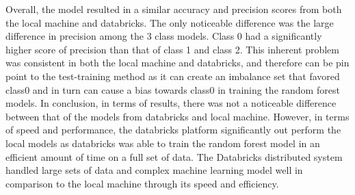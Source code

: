 \documentclass[12pt]{article}
\begin{document}
\begin{multicols*}{2}
  \hspace*{5mm} Overall, the model resulted in a similar accuracy and precision scores from both the local machine and databricks. The only noticeable difference was the large difference
  in precision among the 3 class models. Class 0 had a significantly higher score of precision than that of class 1 and class 2. This inherent problem was consistent in both the local machine and databricks, 
  and therefore can be pin point to the test-training method as it can create an imbalance set that favored class0 and in turn can cause a bias towards class0 in training the random forest models.
  In conclusion, in terms of results, there was not a noticeable difference between that of the models from databricks and local machine. 
  However, in terms of speed and performance, the databricks platform significantly out perform the local models as databricks was able to train the random forest model in an efficient amount of time on a full set of data. 
  The Databricks distributed system handled large sets of data and complex machine learning model well in comparison to the local machine through its speed and efficiency. 



\end{multicols*}

		

	
\end{document}
